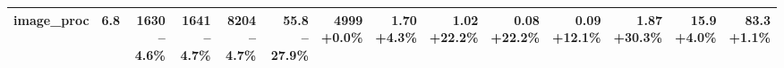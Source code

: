 \begin{table}[t]
{\begin{tabular}{lrrrrrrrrrrrrr}
\midrule
image\_proc & 6.8 & \makecell[r]{1630\\--4.6\%} & \makecell[r]{1641\\--4.7\%} & \makecell[r]{8204\\--4.7\%} & \makecell[r]{55.8\\--27.9\%} & \makecell[r]{4999\\+0.0\%} & \makecell[r]{1.70\\+4.3\%} & \makecell[r]{1.02\\+22.2\%} & \makecell[r]{0.08\\+22.2\%} & \makecell[r]{0.09\\+12.1\%} & \makecell[r]{1.87\\+30.3\%} & \makecell[r]{15.9\\+4.0\%} & \makecell[r]{83.3\\+1.1\%} \\
\bottomrule
\end{tabular}}
\end{table}
